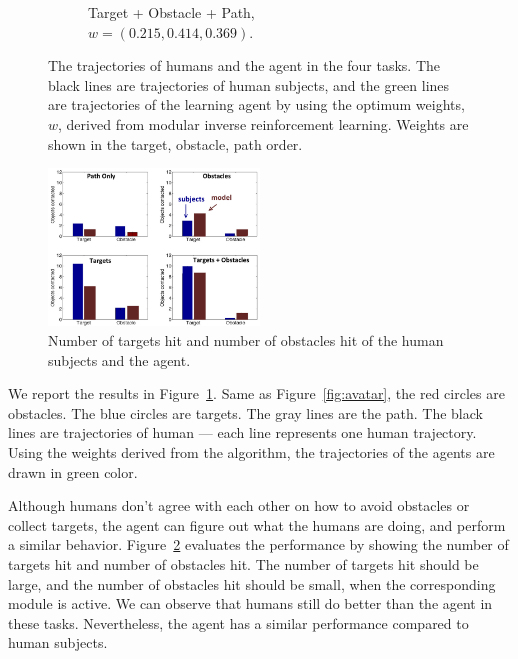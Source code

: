 \documentclass[11pt]{article} %
\begin{document}
\begin{figure}[h]
\begin{subfigure}[b]{0.24\textwidth}
\caption{Target + Obstacle + Path, \\$w = (0.215, 0.414, 0.369)$. }
\end{subfigure}
\caption{The trajectories of humans and the agent in the four tasks. The
black lines are trajectories of human subjects, and the green lines are
trajectories of the learning agent by using the optimum weights, $w$, derived
from modular inverse reinforcement learning. Weights are shown in the target,
obstacle, path order.}

\label{fig:exp}
\end{figure}

\begin{figure}[h]
\centering
\includegraphics[width=0.5\textwidth]{contactStats.png}
\caption{Number of targets hit and number of obstacles hit of the human subjects
and the agent.}
\label{fig:stats}
\end{figure}

We report the results in Figure~\ref{fig:exp}. Same as Figure~\ref{fig:avatar},
the red circles are obstacles. The blue circles are targets. The gray lines are
the path. The black lines are trajectories of human --- each line represents one
human trajectory.
Using the weights derived from the algorithm, the trajectories of the agents are
drawn in green color.

Although humans don't agree with each other on how to avoid obstacles or collect
targets, the agent can figure out what the humans are doing, and perform a
similar behavior. Figure~\ref{fig:stats} evaluates the
performance by showing the number of targets hit and number of obstacles hit.
The number of targets hit should be large, and the number of obstacles hit
should be small, when the corresponding module is active.
We can observe that humans still do better than the agent in these tasks.
Nevertheless, the agent has a similar performance compared to human subjects.
\end{document}
